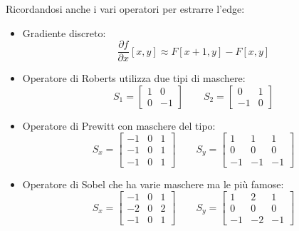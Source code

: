 \documentclass[a4paper]{article}
\begin{document}
	\noindent
	Ricordandosi anche i vari operatori per estrarre l'edge:
	\begin{itemize}
		\item Gradiente discreto:
		\begin{equation*}
			\dfrac{\partial f}{\partial x}\left[x,y\right] \approx F\left[x+1, y\right] - F\left[x,y\right]
		\end{equation*}
		
		\item Operatore di Roberts utilizza due tipi di maschere:
		\begin{equation*}
			S_{1} = \begin{bmatrix}
				1 & 0 \\
				0 & -1
			\end{bmatrix} \hspace{2em} S_{2} = \begin{bmatrix}
			0 & 1 \\
			-1 & 0
		\end{bmatrix}
		\end{equation*}
	
		\item Operatore di Prewitt con maschere del tipo:
		\begin{equation*}
			S_{x} = \begin{bmatrix}
				-1 & 0 & 1 \\
				-1 & 0 & 1 \\
				-1 & 0 & 1
			\end{bmatrix} \hspace{2em} S_{y} = \begin{bmatrix}
				1 & 1 & 1 \\
				0 & 0 & 0 \\
				-1 & -1 & -1
			\end{bmatrix}
		\end{equation*}
		
		\item Operatore di Sobel che ha varie maschere ma le più famose:
		\begin{equation*}
			S_{x} = \begin{bmatrix}
				-1 & 0 & 1 \\
				-2 & 0 & 2 \\
				-1 & 0 & 1
			\end{bmatrix} \hspace{2em} S_{y} = \begin{bmatrix}
				1 & 2 & 1 \\
				0 & 0 & 0 \\
				-1 & -2 & -1
			\end{bmatrix}
		\end{equation*}
	

\end{itemize}
\end{document}
